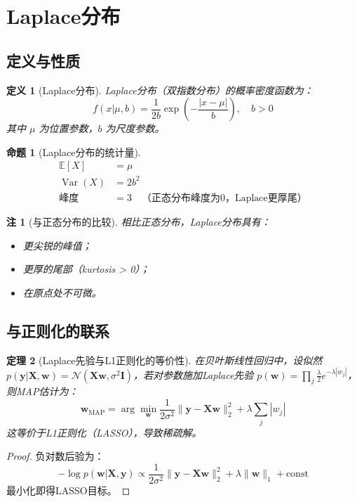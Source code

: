 \documentclass[UTF8, 10pt]{ctexart}
\newtheorem{theorem}{定理}[section]
\newtheorem{definition}{定义}[section]
\newtheorem{proposition}[theorem]{命题}
\newtheorem{remark}{注}[section]
\newcommand{\E}{\mathbb{E}}
\newcommand{\Var}{\operatorname{Var}}
\begin{document}
\section{Laplace分布}
\subsection{定义与性质}
\begin{definition}[Laplace分布]
Laplace分布（双指数分布）的概率密度函数为：
\[
f(x|\mu,b) = \frac{1}{2b}\exp\left(-\frac{|x-\mu|}{b}\right),\quad b > 0
\]
其中 $\mu$ 为位置参数，$b$ 为尺度参数。
\end{definition}

\begin{proposition}[Laplace分布的统计量]
\begin{align*}
    \E[X] &= \mu \\
    \Var(X) &= 2b^2 \\
    \text{峰度} &= 3 \quad \text{（正态分布峰度为0，Laplace更厚尾）}
\end{align*}
\end{proposition}

\begin{remark}[与正态分布的比较]
相比正态分布，Laplace分布具有：
\begin{itemize}
    \item 更尖锐的峰值；
    \item 更厚的尾部（kurtosis > 0）；
    \item 在原点处不可微。
\end{itemize}
\end{remark}

\subsection{与正则化的联系}
\begin{theorem}[Laplace先验与L1正则化的等价性]
在贝叶斯线性回归中，设似然 $p(\bm{y}|\bm{X}, \bm{w}) = \mathcal{N}(\bm{X}\bm{w}, \sigma^2\bm{I})$，若对参数施加Laplace先验 $p(\bm{w}) = \prod_j \frac{\lambda}{2} e^{-\lambda |w_j|}$，则MAP估计为：
\[
\bm{w}_{\text{MAP}} = \arg\min_{\bm{w}} \frac{1}{2\sigma^2}\|\bm{y} - \bm{X}\bm{w}\|_2^2 + \lambda \sum_j |w_j|
\]
这等价于L1正则化（LASSO），导致稀疏解。
\end{theorem}

\begin{proof}
负对数后验为：
\[
-\log p(\bm{w}|\bm{X}, \bm{y}) \propto \frac{1}{2\sigma^2}\|\bm{y} - \bm{X}\bm{w}\|_2^2 + \lambda \|\bm{w}\|_1 + \text{const}
\]
最小化即得LASSO目标。
\end{proof}
\end{document}

